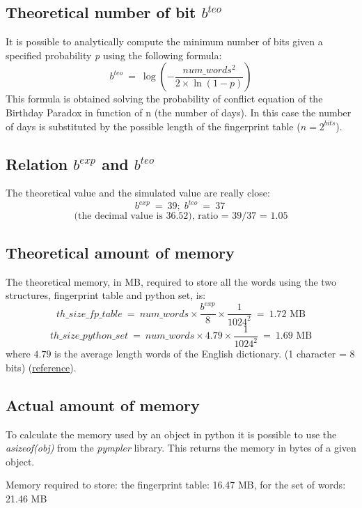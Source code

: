 \documentclass[twocolumn,letterpaper]{report}
\begin{document}
{			\subsection{Theoretical number of bit $b^{teo}$}
					It is possible to analytically compute the minimum number of bits given a specified probability \emph{p} using the following formula:
					\[
							b^{teo} \: = \: \log{ \left( - \frac{num\_words^2}{2\times \ln\left({1-p}\right)} \right)}
					\]
					This formula is obtained solving the probability of conflict equation of the Birthday Paradox in function of n (the number of days). In this case the number of days is substituted by the possible length of the fingerprint table ($n=2^{bits}$).
					
			\subsection{Relation $b^{exp}$ and $b^{teo}$}
					The theoretical value and the simulated value are really close: 
					\[
							b^{exp} \: = \: 39; \; 	b^{teo} \: = \: 37 \:  
					\]
			\[ \text{(the decimal value is 36.52), ratio = 39/37 = 1.05} \]
			
			\subsection{Theoretical amount of memory}
			The theoretical memory, in MB, required to store all the words using the two structures, fingerprint table and python set, is:
			\[th\_size\_fp\_table \: = \: num\_words \times \frac{b^{exp}}{8} \times \frac{1}{1024^2}\: = \: 1.72 \text{ MB}\] 
			\[th\_size\_python\_set \: = \: num\_words \times 4.79 \times \frac{1}{1024^2} \: = \: 1.69 \text{ MB}\] 
			where $4.79$ is the average length words of the English dictionary. (1 character = 8 bits) (\href{http://norvig.com/mayzner.html}{reference}).
						
			\subsection{Actual amount of memory}
			To calculate the memory used by an object in python it is possible to use the \emph{asizeof(obj)} from the \emph{pympler} library. This returns the memory in bytes of a given object.
			\begin{center}
					Memory required to store: the fingerprint table: 16.47 MB, for the set of words: 21.46 MB
			\end{center}
			
}
\end{document}
